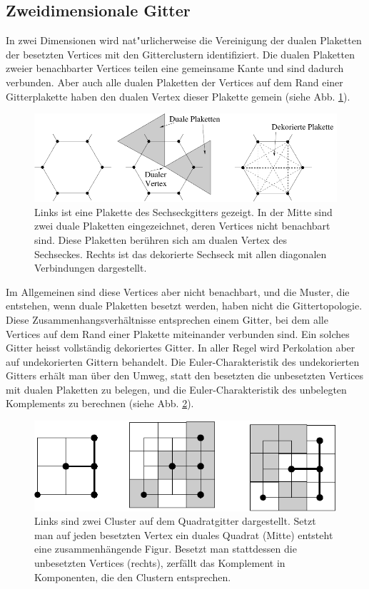 \subsection{Zweidimensionale Gitter}
\label{sec:chimittel2d}
In zwei Dimensionen wird nat"urlicherweise die Vereinigung der dualen Plaketten der besetzten Vertices mit den Gitterclustern identifiziert. Die dualen Plaketten zweier benachbarter Vertices teilen eine gemeinsame Kante und sind dadurch verbunden. Aber auch alle dualen Plaketten der Vertices auf dem Rand einer Gitterplakette haben den dualen Vertex dieser Plakette gemein (siehe Abb. \ref{fig:decoratedtopo}). 
\begin{figure}[htbp]
  \centering
  \includegraphics{./Euler-figs/decoratedtopo}
  \caption{Links ist eine Plakette des Sechseckgitters gezeigt. In der Mitte sind zwei duale Plaketten eingezeichnet, deren Vertices nicht benachbart sind. Diese Plaketten ber\"uhren sich am dualen Vertex des Sechseckes. Rechts ist das dekorierte Sechseck mit allen diagonalen Verbindungen dargestellt.  }
  \label{fig:decoratedtopo}
\end{figure}
Im Allgemeinen sind diese Vertices aber nicht benachbart, und die Muster, die entstehen, wenn duale Plaketten besetzt werden, haben nicht die Gittertopologie. Diese Zusammenhangsverh\"altnisse entsprechen einem Gitter, bei dem alle Vertices auf dem Rand einer Plakette miteinander verbunden sind. Ein solches Gitter heisst vollst\"andig dekoriertes Gitter.
In aller Regel wird Perkolation aber auf undekorierten Gittern behandelt. Die Euler-Charakteristik des undekorierten Gitters erh\"alt man \"uber den Umweg, statt den besetzten die unbesetzten Vertices mit dualen Plaketten zu belegen, und die Euler-Charakteristik des unbelegten Komplements zu berechnen (siehe Abb. \ref{fig:dualplaqu}). 
\begin{figure}[bp]
  \centering
  \includegraphics{./Euler-figs/dualplaqu}
  \caption{Links sind zwei Cluster auf dem Quadratgitter dargestellt. Setzt man auf jeden besetzten Vertex ein duales Quadrat (Mitte) entsteht eine zusammenh\"angende Figur. Besetzt man stattdessen die unbesetzten Vertices (rechts), zerf\"allt das Komplement in Komponenten, die den Clustern entsprechen. }
  \label{fig:dualplaqu}
\end{figure} 
